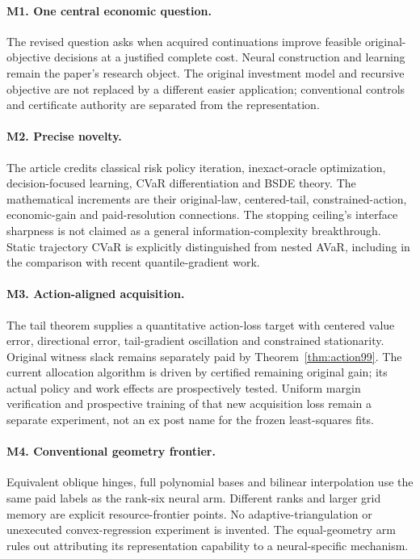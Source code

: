 \documentclass[11pt]{article}
\begin{document}
\paragraph{M1. One central economic question.}
The revised question asks when acquired continuations improve feasible original-objective decisions at a justified complete cost. Neural construction and learning remain the paper's research object. The original investment model and recursive objective are not replaced by a different easier application; conventional controls and certificate authority are separated from the representation.

\paragraph{M2. Precise novelty.}
The article credits classical risk policy iteration, inexact-oracle optimization, decision-focused learning, CVaR differentiation and BSDE theory. The mathematical increments are their original-law, centered-tail, constrained-action, economic-gain and paid-resolution connections. The stopping ceiling's interface sharpness is not claimed as a general information-complexity breakthrough. Static trajectory CVaR is explicitly distinguished from nested AVaR, including in the comparison with recent quantile-gradient work.

\paragraph{M3. Action-aligned acquisition.}
The tail theorem supplies a quantitative action-loss target with centered value error, directional error, tail-gradient oscillation and constrained stationarity. Original witness slack remains separately paid by Theorem~\ref{thm:action99}. The current allocation algorithm is driven by certified remaining original gain; its actual policy and work effects are prospectively tested. Uniform margin verification and prospective training of that new acquisition loss remain a separate experiment, not an ex post name for the frozen least-squares fits.

\paragraph{M4. Conventional geometry frontier.}
Equivalent oblique hinges, full polynomial bases and bilinear interpolation use the same paid labels as the rank-six neural arm. Different ranks and larger grid memory are explicit resource-frontier points. No adaptive-triangulation or unexecuted convex-regression experiment is invented. The equal-geometry arm rules out attributing its representation capability to a neural-specific mechanism.
\end{document}
